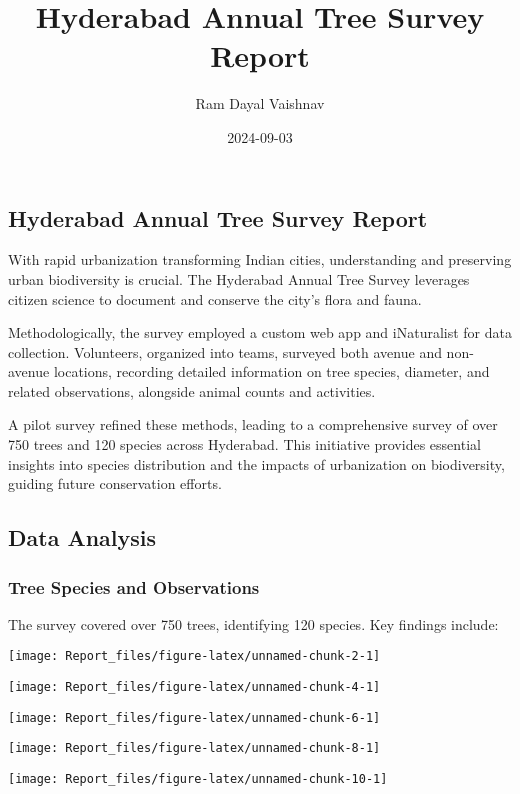\documentclass[
]{article}
\title{Hyderabad Annual Tree Survey Report}
\author{Ram Dayal Vaishnav}
\date{2024-09-03}
\begin{document}
\maketitle

\subsection{Hyderabad Annual Tree Survey
Report}\label{hyderabad-annual-tree-survey-report}

With rapid urbanization transforming Indian cities, understanding and
preserving urban biodiversity is crucial. The Hyderabad Annual Tree
Survey leverages citizen science to document and conserve the city's
flora and fauna.

Methodologically, the survey employed a custom web app and iNaturalist
for data collection. Volunteers, organized into teams, surveyed both
avenue and non-avenue locations, recording detailed information on tree
species, diameter, and related observations, alongside animal counts and
activities.

A pilot survey refined these methods, leading to a comprehensive survey
of over 750 trees and 120 species across Hyderabad. This initiative
provides essential insights into species distribution and the impacts of
urbanization on biodiversity, guiding future conservation efforts.

\subsection{Data Analysis}\label{data-analysis}

\subsubsection{Tree Species and
Observations}\label{tree-species-and-observations}

The survey covered over 750 trees, identifying 120 species. Key findings
include:

\texttt{[image: Report\_files/figure-latex/unnamed-chunk-2-1]}

\texttt{[image: Report\_files/figure-latex/unnamed-chunk-4-1]}

\texttt{[image: Report\_files/figure-latex/unnamed-chunk-6-1]}

\texttt{[image: Report\_files/figure-latex/unnamed-chunk-8-1]}

\texttt{[image: Report\_files/figure-latex/unnamed-chunk-10-1]}
\end{document}
